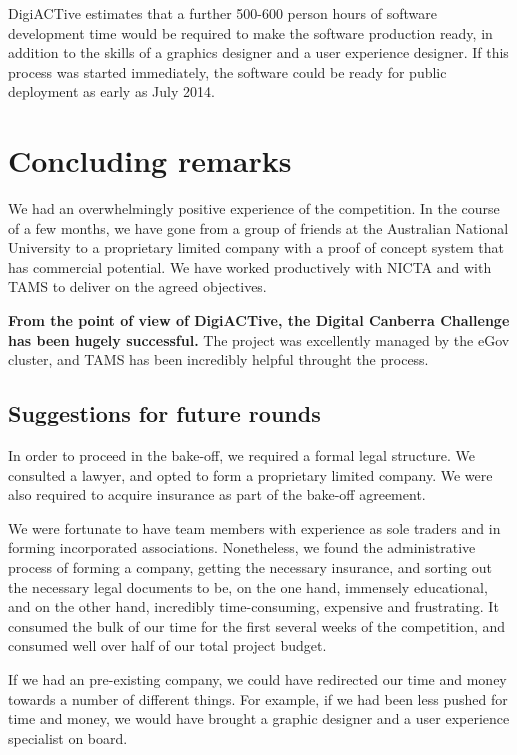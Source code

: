 \documentclass[12pt,a4paper,twosided]{article}
\begin{document}
DigiACTive estimates that a further 500-600 person hours of software
development time would be required to make the software production
ready, in addition to the skills of a graphics designer and a user
experience designer. If this process was started immediately, the
software could be ready for public deployment as early as July 2014.


\newpage
\section{Concluding remarks}

We had an overwhelmingly positive experience of the competition. In the
course of a few months, we have gone from a group of friends at the
Australian National University to a proprietary limited company with a
proof of concept system that has commercial potential. We have worked
productively with NICTA and with TAMS to deliver on the agreed
objectives.

\textbf{From the point of view of DigiACTive, the Digital Canberra
Challenge has been hugely successful.} The project was excellently
managed by the eGov cluster, and TAMS has been incredibly helpful
throught the process.

\subsection{Suggestions for future rounds}

In order to proceed in the bake-off, we required a formal legal
structure. We consulted a lawyer, and opted to form a proprietary
limited company. We were also required to acquire insurance as part of
the bake-off agreement.

We were fortunate to have team members with experience as sole traders
and in forming incorporated associations. Nonetheless, we found the
administrative process of forming a company, getting the necessary
insurance, and sorting out the necessary legal documents to be, on the
one hand, immensely educational, and on the other hand, incredibly
time-consuming, expensive and frustrating. It consumed the bulk of our
time for the first several weeks of the competition, and consumed well
over half of our total project budget.

If we had an pre-existing company, we could have redirected our time and
money towards a number of different things. For example, if we had been
less pushed for time and money, we would have brought a graphic designer
and a user experience specialist on board.
\end{document}
